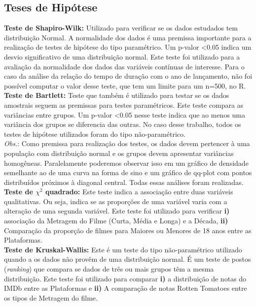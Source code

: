 \documentclass[a4paper, 12pt]{article} %
\begin{document}
\subsection{Teses de Hipótese}

\textbf{Teste de Shapiro-Wilk:} Utilizado para verificar se os dados estudados tem distribuição Normal. A normalidade dos dados é uma premissa importante para a realização de testes de hipótese do tipo paramétrico. Um p-valor <0.05 indica um desvio significativo de uma distribuição normal. Este teste foi utilizado para a avaliação da normalidade dos dados das variáveis contínuas de interesse. Para o caso da análise da relação do tempo de duração com o ano de lançamento, não foi possível computar o valor desse teste, que tem um limite para um n=500, no R. \\

\textbf{Teste de Bartlett:} Teste que também é utilizado para testar se os dados amostrais seguem as premissas para testes paramétricos. Este teste compara as variâncias entre grupos. Um p-valor <0.05 nesse teste indica que ao menos uma variância dos grupos se diferencia das outras. No caso desse trabalho, todos os testes de hipótese utilizados foram do tipo não-paramétrico.\\

\emph{Obs.}: Como premissa para realização dos testes, os dados devem pertencer à uma população com distribuição normal e os grupos devem apresentar variâncias homogêneas. Paralelamente poderemos observar isso em um gráfico de densidade semelhante ao de uma curva na forma de sino e um gráfico de qq-plot com pontos distribuídos próximos à diagonal central. Todas essas análises foram realizadas.\\

\textbf{ Teste de $\chi^2$ quadrado:} Este teste indica a associação entre duas variáveis qualitativas. Ou seja, indica se as proporções de uma variável varia com a alteração de uma segunda variável. Este teste foi utilizado para verificar \textbf{i)} associação da Metragem do Filme (Curta, Média e Longa) e a Década, \textbf{ii)} Comparação da proporção de filmes para Maiores ou Menores de 18 anos entre as Plataformas. \\

\textbf{Teste de Kruskal-Wallis:} Este é um teste do tipo não-paramétrico utilizado quando a os dados não provêm de uma distribuição normal. É um teste de postos (\emph{ranking}) que compara se dados de três ou mais grupos têm a mesma distribuição. Este teste foi utilizado para comparar \textbf{i)}  a distribuição de notas do IMDb entre as Plataformas e \textbf{ii)} A comparação de notas Rotten Tomatoes entre os tipos de Metragem do filme. \\
\end{document}
